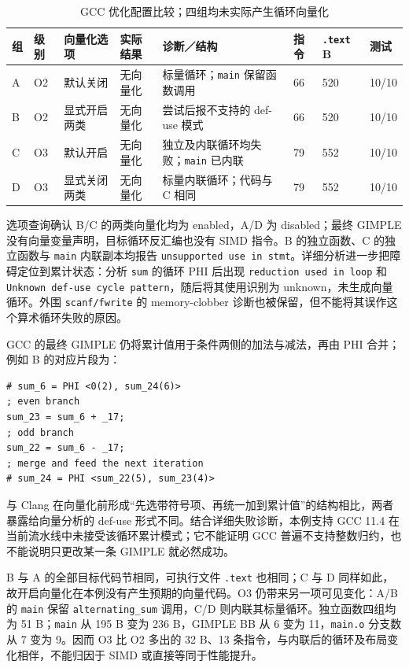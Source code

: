 \begin{table}[H]
\centering\footnotesize
\setlength{\tabcolsep}{3pt}
\caption{GCC 优化配置比较；四组均未实际产生循环向量化}
\label{tab:gcc-controlled}
\begin{tabularx}{\textwidth}{L{0.45cm}L{0.65cm}L{1.6cm}L{1.15cm}Y L{0.9cm}L{1.0cm}L{1.0cm}}
\toprule{}
组 & 级别 & 向量化选项 & 实际结果 & 诊断／结构 & 指令 & \texttt{.text} B & 测试 \\
\midrule
A & O2 & 默认关闭 & 无向量化 & 标量循环；\texttt{main} 保留函数调用 & 66 & 520 & 10/10 \\
B & O2 & 显式开启两类 & 无向量化 & 尝试后报不支持的 def-use 模式 & 66 & 520 & 10/10 \\
C & O3 & 默认开启 & 无向量化 & 独立及内联循环均失败；\texttt{main} 已内联 & 79 & 552 & 10/10 \\
D & O3 & 显式关闭两类 & 无向量化 & 标量内联循环；代码与 C 相同 & 79 & 552 & 10/10 \\
\bottomrule
\end{tabularx}
\end{table}

选项查询确认 B/C 的两类向量化均为 enabled，A/D 为 disabled；最终 GIMPLE 没有向量变量声明，目标循环反汇编也没有 SIMD 指令。B 的独立函数、C 的独立函数与 \texttt{main} 内联副本均报告 \texttt{unsupported use in stmt}。详细分析进一步把障碍定位到累计状态：分析 \texttt{sum} 的循环 PHI 后出现 \texttt{reduction used in loop} 和 \texttt{Unknown def-use cycle pattern}，随后将其使用识别为 unknown，未生成向量循环。外围 \texttt{scanf/fwrite} 的 memory-clobber 诊断也被保留，但不能将其误作这个算术循环失败的原因。

GCC 的最终 GIMPLE 仍将累计值用于条件两侧的加法与减法，再由 PHI 合并；例如 B 的对应片段为：
\begin{lstlisting}[caption={GCC B 的标量累计状态；摘录保留原 GIMPLE 名称}]
# sum_6 = PHI <0(2), sum_24(6)>
; even branch
sum_23 = sum_6 + _17;
; odd branch
sum_22 = sum_6 - _17;
; merge and feed the next iteration
# sum_24 = PHI <sum_22(5), sum_23(4)>
\end{lstlisting}
与 Clang 在向量化前形成“先选带符号项、再统一加到累计值”的结构相比，两者暴露给向量分析的 def-use 形式不同。结合详细失败诊断，本例支持 GCC 11.4 在当前流水线中未接受该循环累计模式；它不能证明 GCC 普遍不支持整数归约，也不能说明只更改某一条 GIMPLE 就必然成功。

B 与 A 的全部目标代码节相同，可执行文件 \texttt{.text} 也相同；C 与 D 同样如此，故开启向量化在本例没有产生预期的向量代码。O3 仍带来另一项可见变化：A/B 的 \texttt{main} 保留 \texttt{alternating\_sum} 调用，C/D 则内联其标量循环。独立函数四组均为 51 B；\texttt{main} 从 195 B 变为 236 B，GIMPLE BB 从 6 变为 11，\texttt{main.o} 分支数从 7 变为 9。因而 O3 比 O2 多出的 32 B、13 条指令，与内联后的循环及布局变化相伴，不能归因于 SIMD 或直接等同于性能提升。

